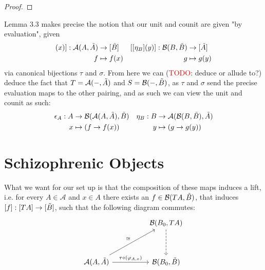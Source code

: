 \documentclass[12pt,a4paper]{article}
\def\HomA{\ensuremath\mathcal{A}}
\def\HomB{\ensuremath\mathcal{B}}
\def\t{\ensuremath\tilde}
\begin{document}
\begin{proof}
\end{proof}
Lemma 3.3 makes precise the notion that our unit and counit are given "by evaluation", given
\begin{align*}
	[[\epsilon_A](x)]: \HomA(A, \t A) &\to [\t B] & [[\eta_B](y)]:\HomB(B, \t B) &\to [\t A]\\
	f &\mapsto f(x) & g &\mapsto g(y) 
\end{align*}
via canonical bijections $\tau$ and $\sigma$. From here we can (\textcolor{red}{TODO}: deduce or allude to?) deduce the fact that $T = \HomA(-, \t A)$ and $S = \HomB(-, \t B)$, as $\tau$ and $\sigma$ send the precise evaluation maps to the other pairing, and as such we can view the unit and counit as such:
\begin{align*}
	\epsilon_A:  A&\to \HomB(\HomA(A, \t A),\t B) & \eta_B: B&\to \HomA(\HomB(B, \t B),\t A)\\
	x &\mapsto (f \to f(x)) & y &\mapsto (g\to g(y) )
\end{align*}
\section{Schizophrenic Objects}
What we want for our set up is that the composition of these maps induces a lift, i.e. for every $A \in \mathcal{A}$ and  $x \in A$ there exists an $f \in \HomB(TA, \t B)$, that induces  $[f]: [TA] \to [\t B]$, such that the following diagram commutes: 
\[\begin{tikzcd}
	&& \HomB(B_0, TA)  \\
	\\
	\HomA(A, \tilde A)  && \HomB (B_0, \tilde B) 
	\arrow[dashed, from=1-3, to=3-3]
	\arrow["\cong",from=3-1, to=1-3]
	\arrow["\tau \circ (\varphi_{A,x}) ",from=3-1, to=3-3]
\end{tikzcd}\]
\end{document}

